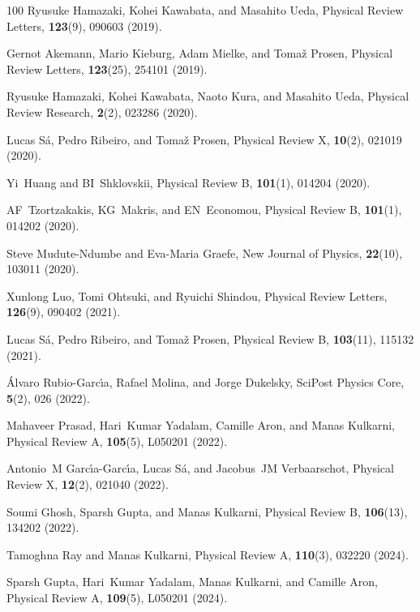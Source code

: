 \documentclass[preprint,pteplogo]{ptephy_v2}%
\numberwithin{equation}{section}
\theoremstyle{definition}
\begin{document}
\begin{thebibliography}{100}
Ryusuke Hamazaki, Kohei Kawabata, and Masahito Ueda, Physical Review Letters, {\bf 123}(9), 090603 (2019).

Gernot Akemann, Mario Kieburg, Adam Mielke, and Toma{\v{z}} Prosen, Physical Review Letters, {\bf 123}(25), 254101 (2019).

Ryusuke Hamazaki, Kohei Kawabata, Naoto Kura, and Masahito Ueda, Physical Review Research, {\bf 2}(2), 023286 (2020).

Lucas S{\'a}, Pedro Ribeiro, and Toma{\v{z}} Prosen, Physical Review X, {\bf 10}(2), 021019 (2020).

Yi~Huang and BI~Shklovskii, Physical Review B, {\bf 101}(1), 014204 (2020).

AF~Tzortzakakis, KG~Makris, and EN~Economou, Physical Review B, {\bf 101}(1), 014202 (2020).

Steve Mudute-Ndumbe and Eva-Maria Graefe, New Journal of Physics, {\bf 22}(10), 103011 (2020).

Xunlong Luo, Tomi Ohtsuki, and Ryuichi Shindou, Physical Review Letters, {\bf 126}(9), 090402 (2021).

Lucas S{\'a}, Pedro Ribeiro, and Toma{\v{z}} Prosen, Physical Review B, {\bf 103}(11), 115132 (2021).

{\'A}lvaro Rubio-Garc{\'\i}a, Rafael Molina, and Jorge Dukelsky, SciPost Physics Core, {\bf 5}(2), 026 (2022).

Mahaveer Prasad, Hari~Kumar Yadalam, Camille Aron, and Manas Kulkarni, Physical Review A, {\bf 105}(5), L050201 (2022).

Antonio~M Garc{\'\i}a-Garc{\'\i}a, Lucas S{\'a}, and Jacobus~JM Verbaarschot, Physical Review X, {\bf 12}(2), 021040 (2022).

Soumi Ghosh, Sparsh Gupta, and Manas Kulkarni, Physical Review B, {\bf 106}(13), 134202 (2022).

Tamoghna Ray and Manas Kulkarni, Physical Review A, {\bf 110}(3), 032220 (2024).

Sparsh Gupta, Hari~Kumar Yadalam, Manas Kulkarni, and Camille Aron, Physical Review A, {\bf 109}(5), L050201 (2024).


\end{thebibliography}
\end{document}
